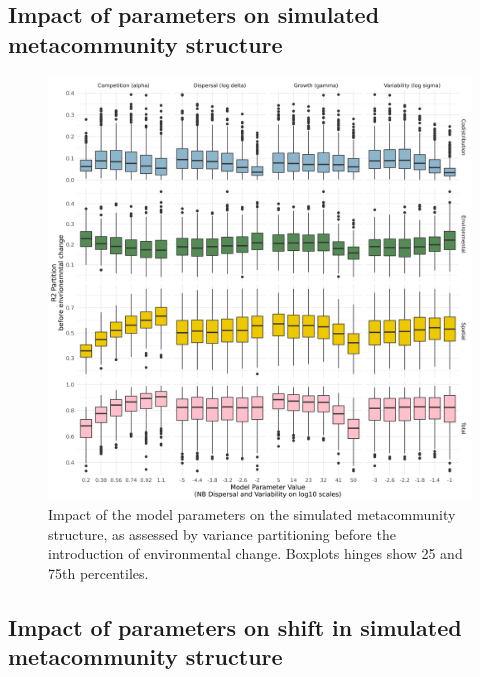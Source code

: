 \documentclass[
]{article}
\begin{document}
\hypertarget{impact-of-parameters-on-simulated-metacommunity-structure}{%
\subsection{Impact of parameters on simulated metacommunity
structure}\label{impact-of-parameters-on-simulated-metacommunity-structure}}

\begin{figure}
\centering
\includegraphics{SimulationMarkdowns/Figures/ParamStart.png}
\caption{Impact of the model parameters on the simulated metacommunity
structure, as assessed by variance partitioning before the introduction
of environmental change. Boxplots hinges show 25 and 75th percentiles.}
\end{figure}

\hypertarget{impact-of-parameters-on-shift-in-simulated-metacommunity-structure}{%
\subsection{Impact of parameters on shift in simulated metacommunity
structure}\label{impact-of-parameters-on-shift-in-simulated-metacommunity-structure}}
\end{document}
